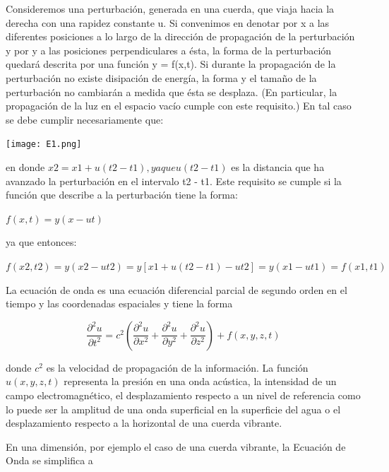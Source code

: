 \documentclass[12pt]{article}
\begin{document}
Consideremos una perturbación, generada en una cuerda, que viaja hacia
la derecha con una rapidez constante u. Si convenimos en denotar por x
a las diferentes posiciones a lo largo de la dirección de propagación de la
perturbación y por y a las posiciones perpendiculares a ésta, la forma de la
perturbación quedará descrita por una función y = f(x,t). Si durante la propagación
de la perturbación no existe disipación de energía, la forma y el tamaño de la
perturbación no cambiarán a medida que ésta se desplaza. (En particular, la
propagación de la luz en el espacio vacío cumple con este requisito.) En tal caso
se debe cumplir necesariamente que:

\begin{center}
    \texttt{[image: E1.png]}
\end{center}

en donde $x2 = x1 + u(t2 - t1), ya que u(t2 - t1)$ es la distancia que ha avanzado la
perturbación en el intervalo t2 - t1. Este requisito se cumple si la función que
describe a la perturbación tiene la forma:

\begin{center}
    $f(x,t) = y(x - ut) $
    
    ya que entonces:
    
    $f(x2,t2) = y(x2 - ut2) = y[x1 + u(t2 - t1)- ut2] = y( x1 - ut1) = f(x1,t1)$
    
\end{center}

La ecuación de onda es una ecuación diferencial parcial de segundo orden en el tiempo y las coordenadas espaciales y tiene la forma

\begin{equation*}
\frac{\partial^2 u}{\partial t^2} = c^2 \left( 
  \frac{\partial^2 u}{\partial x^2} +
  \frac{\partial^2 u}{\partial y^2} +
  \frac{\partial^2 u}{\partial z^2} \right) + f(x,y,z,t)
\end{equation*}

donde $c^{2}$ es la velocidad de propagación de la información. La función $u(x,y,z,t)$ representa la presión en una onda acústica, la intensidad de un campo electromagnético, el desplazamiento respecto a un nivel de referencia como lo puede ser la amplitud de una onda superficial en la superficie del agua o el desplazamiento respecto a la horizontal de una cuerda vibrante. 

En una dimensión, por ejemplo el caso de una cuerda vibrante, la Ecuación de Onda se simplifica a 
\end{document}
